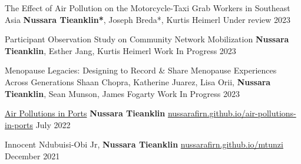 

\begin{cventries}

\cvpub
    {The Effect of Air Pollution on the Motorcycle-Taxi Grab Workers in Southeast Asia} %
    {\textbf{Nussara Tieanklin*}, Joseph Breda*, Kurtis Heimerl} %
    {Under review} %
    {2023} %


\cvpub
    {Participant Observation Study on Community Network Mobilization} %
    {\textbf{Nussara Tieanklin}, Esther Jang, Kurtis Heimerl} %
    {Work In Progress} %
    {2023} %
   
   

\cvpub
    {Menopause Legacies: Designing to Record \& Share Menopause Experiences Across Generations} %
    {Shaan Chopra, Katherine Juarez, Lisa Orii, \textbf{Nussara Tieanklin}, Sean Munson, James Fogarty} %
    {Work In Progress} %
    {2023} %
   


\cvpub
      { \href{https://nussarafirn.github.io/air-pollutions-in-ports}{Air Pollutions in Ports}} %
    {\textbf{Nussara Tieanklin}} %
    { \href{https://nussarafirn.github.io/air-pollutions-in-ports}{nussarafirn.github.io/air-pollutions-in-ports}} %
    {July 2022} %

\cvpub
    {} %
    {Innocent Ndubuisi-Obi Jr, \textbf{Nussara Tieanklin}} %
    { \href{https://nussarafirn.github.io/mtunzi}{nussarafirn.github.io/mtunzi}} %
    {December 2021} %


\end{cventries}
